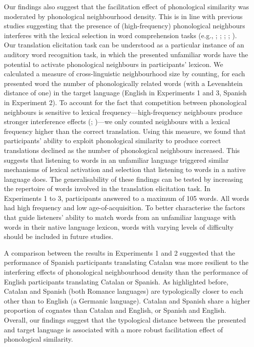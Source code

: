 \documentclass[
  man,
  longtable,
  nolmodern,
  notxfonts,
  notimes,
  colorlinks=true,linkcolor=blue,citecolor=blue,urlcolor=blue]{apa7}
\begin{document}
Our findings also suggest that the facilitation effect of phonological
similarity was moderated by phonological neighbourhood density. This is
in line with previous studies suggesting that the presence of
(high-frequency) phonological neighbours interferes with the lexical
selection in word comprehension tasks (e.g.,
;
;
;
;
). Our
translation elicitation task can be understood as a particular instance
of an auditory word recognition task, in which the presented unfamiliar
words have the potential to activate phonological neighbours in
participants' lexicon. We calculated a measure of cross-linguistic
neighbourhood size by counting, for each presented word the number of
phonologically related words (with a Levenshtein distance of one) in the
target language (English in Experiments 1 and 3, Spanish in Experiment
2). To account for the fact that competition between phonological
neighbours is sensitive to lexical frequency---high-frequency neighbours
produce stronger interference effects
(;
)---we only
counted neighbours with a lexical frequency higher than the correct
translation. Using this measure, we found that participants' ability to
exploit phonological similarity to produce correct translations declined
as the number of phonological neighbours increased. This suggests that
listening to words in an unfamiliar language triggered similar
mechanisms of lexical activation and selection that listening to words
in a native language does. The generalisability of these findings can be
tested by increasing the repertoire of words involved in the translation
elicitation task. In Experiments 1 to 3, participants answered to a
maximum of 105 words. All words had high frequency and low
age-of-acquisition. To better characterise the factors that guide
listeners' ability to match words from an unfamiliar language with words
in their native language lexicon, words with varying levels of
difficulty should be included in future studies.

A comparison between the results in Experiments 1 and 2 suggested that
the performance of Spanish participants translating Catalan was more
resilient to the interfering effects of phonological neighbourhood
density than the performance of English participants translating Catalan
or Spanish. As highlighted before, Catalan and Spanish (both Romance
languages) are typologically closer to each other than to English (a
Germanic language). Catalan and Spanish share a higher proportion of
cognates than Catalan and English, or Spanish and English. Overall, our
findings suggest that the typological distance between the presented and
target language is associated with a more robust facilitation effect of
phonological similarity.
\end{document}
